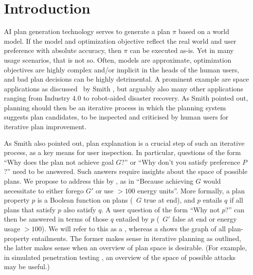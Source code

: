 \section{Introduction}
\label{introduction}

AI plan generation technology serves to generate a plan $\pi$ based on
a world model. If the model and optimization objective reflect the
real world and user preference with absolute accuracy, then $\pi$ can
be executed as-is. Yet in many usage scenarios, that is not so. Often,
models are approximate, optimization objectives are highly complex
and/or implicit in the heads of the human users, and bad plan
decisions can be highly detrimental. A prominent example are space
applications as discussed \eg\ by Smith , but
arguably also many other applications ranging from Industry 4.0 to
robot-aided disaster recovery. As Smith pointed out, planning should
then be an iterative process in which the planning system suggests
plan candidates, to be inspected and criticised by human users for
iterative plan improvement.

As Smith also pointed out, plan explanation is a crucial step of such
an iterative process, as a key means for user inspection. In
particular, questions of the form ``Why does the plan not achieve goal
$G$?'' or ``Why don't you satisfy preference $P$?'' need to be
answered. Such answers require insights about the space of possible
plans. We propose to address this by , as in ``Because achieving $G$ would necessitate to
either forego $G'$ or use $> 100$ energy units''. More formally, a
plan property $p$ is a Boolean function on plans (\eg\ $G$ true at
end), and $p$ entails $q$ if all plans that satisfy $p$ also satisfy
$q$.  A user question of the form ``Why not $p$?'' can then be
answered in terms of those $q$ entailed by $p$ (\eg\ $G'$ false at end
or energy usage $> 100$). We will refer to this as a , whereas a  shows the graph
of all plan-property entailments. The former makes sense in iterative
planning as outlined, the latter makes sense when an overview of plan
space is desirable. (For example, in simulated penetration testing
\cite{boddy:etal:icaps-05,hoffmann:icaps-15}, an overview of the space
of possible attacks may be useful.)
%
  
